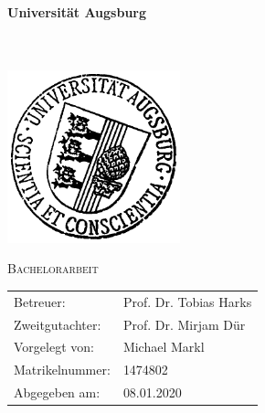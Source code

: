 
\thispagestyle{empty}
\newcommand{\Universitat}{Universität Augsburg}
\begin{titlepage}
  	\begin{center}
		\LARGE \textbf{\Universitat} \\
		\uni \\
		\makebox[0pt]{\text{\lehrstuhl}} \\
	\end{center}
	\vspace*{1em}
	\begin{center}
		\includegraphics[width=5cm,height=5cm]{UNI}
	\end{center}
	
	\vspace*{1em}
	
	\begin{center}
		\Huge\textsc{Bachelorarbeit}
	\end{center}
	
	\vspace*{1cm}
	\ownline
	\begin{center}
	\end{center}
	\ownline
    \vfill
    {\setlength{\tabcolsep}{12pt}
   	\centering
	\begin{tabular}{ll}
		Betreuer: & Prof. Dr. Tobias Harks\\
		Zweitgutachter: & Prof. Dr. Mirjam Dür\\[1em]
		Vorgelegt von: & Michael Markl\\
		Matrikelnummer: & 1474802\\
		Abgegeben am: & 08.01.2020
	\end{tabular}\par
	}
\end{titlepage}